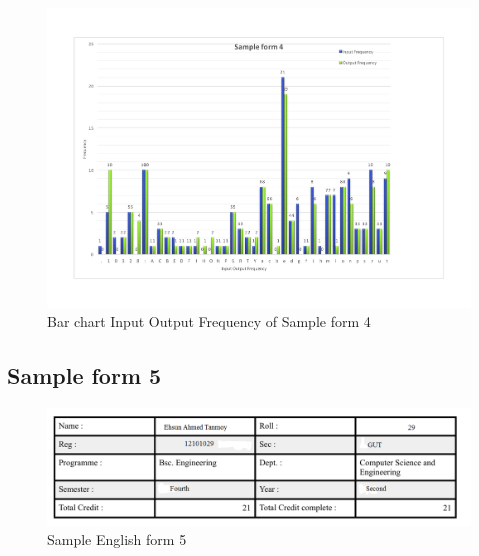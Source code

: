 \begin{figure}[H]
\centering
\includegraphics[width=1\textwidth]{form4.pdf}
\caption {Bar chart Input Output Frequency of Sample form 4}
\label {fig:bar4}
\end{figure}

\subsection{Sample form 5}

\begin{figure}[H]
\centering
\includegraphics[width=1\textwidth]{form5.png}
\caption {Sample English form 5}
\label {fig:form4}
\end{figure}

